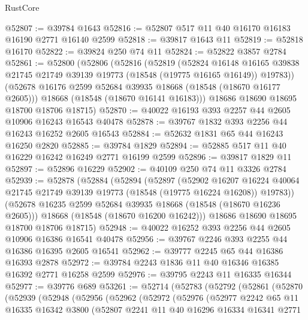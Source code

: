 \begin{lexlean}{RustCore}
\begin{coremodule}
@52807 := @39784 @1643
@52816 := @52807 @517 @11 @40 @16170 @16183 @16190 @2771 @16140 @2599
@52818 := @39817 @1643 @11
@52819 := @52818 @16170
@52822 := @39824 @250 @74 @11
@52824 := @52822 @3857 @2784
@52861 := @52800
    (@52806
      (@52816
        (@52819
          (@52824
            @16148
            @16165
            @39838
            @21745
            @21749
            @39139
            @19773
            (@18548 (@19775 @16165 @16149))
            @19783))
        (@52678 @16176 @2599 @52684 @39935 @18668 (@18548 (@18670 @16177 @2605)))
        @18668
        (@18548 (@18670 @16141 @16183)))
      @18686
      @18690
      @18695
      @18700
      @18706
      @18715)
@52870 := @40022 @16193 @393 @2257 @44 @2605 @10906 @16243 @16543 @40478
@52878 := @39767 @1832 @393 @2256 @44 @16243 @16252 @2605 @16543
@52884 := @52632 @1831 @65 @44 @16243 @16250 @2820
@52885 := @39784 @1829
@52894 := @52885 @517 @11 @40 @16229 @16242 @16249 @2771 @16199 @2599
@52896 := @39817 @1829 @11
@52897 := @52896 @16229
@52902 := @40109 @250 @74 @11 @3326 @2784
@52939 := @52878
    (@52884
      (@52894
        (@52897
          (@52902
            @16207
            @16224
            @40064
            @21745
            @21749
            @39139
            @19773
            (@18548 (@19775 @16224 @16208))
            @19783))
        (@52678 @16235 @2599 @52684 @39935 @18668 (@18548 (@18670 @16236 @2605)))
        @18668
        (@18548 (@18670 @16200 @16242)))
      @18686
      @18690
      @18695
      @18700
      @18706
      @18715)
@52948 := @40022 @16252 @393 @2256 @44 @2605 @10906 @16386 @16541 @40478
@52956 := @39767 @2246 @393 @2255 @44 @16386 @16395 @2605 @16541
@52962 := @39777 @2245 @65 @44 @16386 @16393 @2878
@52972 := @39784 @2243 @1836 @11 @40 @16346 @16385 @16392 @2771 @16258 @2599
@52976 := @39795 @2243 @11 @16335 @16344
@52977 := @39776 @689
@53261 := @52714
    (@52783
      (@52792
        (@52861
          (@52870
            (@52939
              (@52948
                (@52956
                  (@52962
                    (@52972
                      (@52976
                        (@52977
                          @2242
                          @65
                          @11
                          @16335
                          @16342
                          @3800
                          (@52807
                            @2241
                            @11
                            @40
                            @16296
                            @16334
                            @16341
                            @2771

\end{coremodule}
\end{lexlean}
